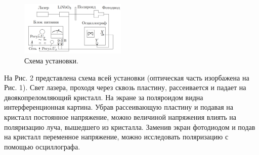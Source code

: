 \documentclass[a4paper,12pt]{article}
\begin{document}
\begin{figure}
\begin{center}
\includegraphics[width = 0.45\textwidth]{2.png}
\end{center}
\vspace{-40ptx}
\caption{Схема установки.}
\end{figure}
На Рис. 2 представлена схема всей установки (оптическая часть изорбажена на Рис. 1). Свет лазера, проходя через сквозь пластину, рассеивается и падает на двоякопреломляющий кристалл. На экране за поляроидом видна интерференционная картина. Убрав рассеивающую пластину и подавая на кристалл постоянное напряжение, можно величиной напряжения влиять на поляризацию луча, вышедшего из кристалла. Заменив экран фотодиодом и подав на кристалл переменное напряжение, можно исследовать поляризацию с помощью осциллографа.
\newpage
\end{document}

